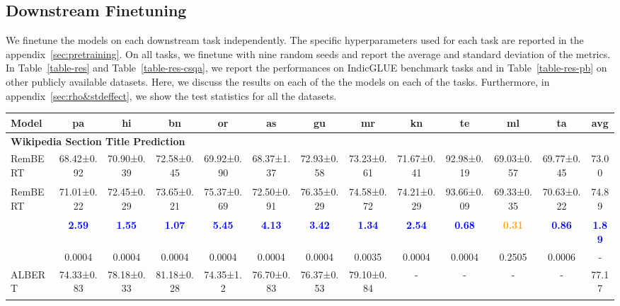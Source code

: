 \documentclass[11pt]{article}
\begin{document}
\subsection{Downstream Finetuning}
\label{downstream-finetuning}
We finetune the models on each downstream task independently.
The specific hyperparameters used for each task are reported in the appendix~\ref{sec:pretraining}. On all tasks, we finetune with nine random seeds and report the average and standard deviation of the metrics. In Table~\ref{table-res} and Table~\ref{table-res-csqa}, we report the performances on IndicGLUE benchmark tasks and in Table~\ref{table-res-pb} on other publicly available datasets. Here, we discuss the results on each of the the models on each of the tasks. Furthermore, in appendix~\ref{sec:rho&stdeffect}, we show the test statistics for all the datasets. 
\begin{table*}[hbt!]
\begin{adjustbox}{max width=\textwidth}
\begin{tabular}{l c c c c c c c c c c c c}
\toprule[2pt]
\textbf{Model} & \textbf{pa} & \textbf{hi} & \textbf{bn} & \textbf{or} & \textbf{as} & \textbf{gu} & \textbf{mr} & \textbf{kn} & \textbf{te} & \textbf{ml} & \textbf{ta} & \textbf{avg} \\
\midrule[2pt]
\multicolumn{13}{l}{\textbf{Wikipedia Section Title Prediction}}\\
RemBERT\textsubscript{}   & 68.42±0.92 & 70.90±0.39 & 72.58±0.45 & 69.92±0.90 & 68.37±1.37 & 72.93±0.58 & 73.23±0.61 & 71.67±0.41 & 92.98±0.19 & 69.03±0.57 & 69.77±0.45 & 73.00\\
RemBERT\textsubscript{}   & 71.01±0.22 & 72.45±0.29 & 73.65±0.21 & 75.37±0.69 & 72.50±0.91 & 76.35±0.29 & 74.58±0.72 & 74.21±0.29 & 93.66±0.09 & 69.33±0.35 & 70.63±0.22 & 74.89\\
 & \textcolor{blue}{\textbf{2.59}} & \textcolor{blue}{\textbf{1.55}} & \textcolor{blue}{\textbf{1.07}} & \textcolor{blue}{\textbf{5.45}} & \textcolor{blue}{\textbf{4.13}} & \textcolor{blue}{\textbf{3.42}} & \textcolor{blue}{\textbf{1.34}} & \textcolor{blue}{\textbf{2.54}} & \textcolor{blue}{\textbf{0.68}} & \textcolor{orange}{\textbf{0.31}} & \textcolor{blue}{\textbf{0.86}} & \textcolor{blue}{\textbf{1.89}}\\
 &0.0004	&0.0004	&0.0004	&0.0004	&0.0004	&0.0004	&0.0035 &0.0004 & 0.0004 & 0.2505 & 0.0006 & -\\
\midrule[1pt]
ALBERT\textsubscript{}           & 74.33±0.83 & 78.18±0.33 & 81.18±0.28 & 74.35±1.2 & 76.70±0.83 & 76.37±0.53 & 79.10±0.84 & - &- & - & - & 77.17 \\

\end{tabular}
\end{adjustbox}
\end{table*}
\end{document}
